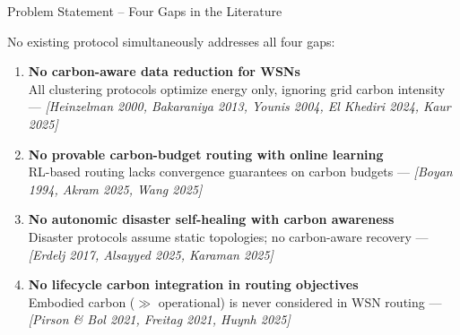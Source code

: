 \documentclass[aspectratio=169, 11pt]{beamer}
\begin{document}
\begin{frame}{Problem Statement -- Four Gaps in the Literature}
\begin{block}{No existing protocol simultaneously addresses all four gaps:}
\end{block}
\vspace{1mm}
\begin{enumerate}[nosep]
    \item[\textcolor{alertred}{\textbf{P1}}] \textbf{No carbon-aware data reduction for WSNs}\\
    {\scriptsize All clustering protocols optimize energy only, ignoring grid carbon intensity ---
    \textit{[Heinzelman 2000, Bakaraniya 2013, Younis 2004, El Khediri 2024, Kaur 2025]}}

    \vspace{1mm}
    \item[\textcolor{alertred}{\textbf{P2}}] \textbf{No provable carbon-budget routing with online learning}\\
    {\scriptsize RL-based routing lacks convergence guarantees on carbon budgets ---
    \textit{[Boyan 1994, Akram 2025, Wang 2025]}}

    \vspace{1mm}
    \item[\textcolor{alertred}{\textbf{P3}}] \textbf{No autonomic disaster self-healing with carbon awareness}\\
    {\scriptsize Disaster protocols assume static topologies; no carbon-aware recovery ---
    \textit{[Erdelj 2017, Alsayyed 2025, Karaman 2025]}}

    \vspace{1mm}
    \item[\textcolor{alertred}{\textbf{P4}}] \textbf{No lifecycle carbon integration in routing objectives}\\
    {\scriptsize Embodied carbon ($\gg$ operational) is never considered in WSN routing ---
    \textit{[Pirson \& Bol 2021, Freitag 2021, Huynh 2025]}}
\end{enumerate}
\end{frame}
\end{document}
